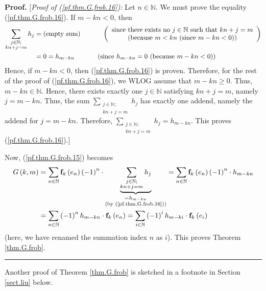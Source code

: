 \documentclass[numbers=enddot,12pt,final,onecolumn,notitlepage]{scrartcl}%
\theoremstyle{definition}
\newenvironment{proof}[1][Proof]{\noindent\textbf{#1.} }{\ \rule{0.5em}{0.5em}}
\let\sumnonlimits\sum
\renewcommand{\sum}{\sumnonlimits\limits}
\newenvironment{verlong}{}{}
\begin{document}
\begin{proof}
\begin{verlong}
[\textit{Proof of (\ref{pf.thm.G.frob.16}):} Let $n\in\mathbb{N}$. We must
prove the equality (\ref{pf.thm.G.frob.16}). If $m-kn<0$, then%
\begin{align*}
\sum_{\substack{j\in\mathbb{N};\\kn+j=m}}h_{j}  &  =\left(  \text{empty
sum}\right)  \ \ \ \ \ \ \ \ \ \ \left(
\begin{array}
[c]{c}%
\text{since there exists no }j\in\mathbb{N}\text{ such that }kn+j=m\\
\text{(because }m<kn\text{ (since }m-kn<0\text{))}%
\end{array}
\right) \\
&  =0=h_{m-kn}\ \ \ \ \ \ \ \ \ \ \left(  \text{since }h_{m-kn}=0\text{
(because }m-kn<0\text{)}\right)
\end{align*}
Hence, if $m-kn<0$, then (\ref{pf.thm.G.frob.16}) is proven. Therefore, for
the rest of the proof of (\ref{pf.thm.G.frob.16}), we WLOG assume that
$m-kn\geq0$. Thus, $m-kn\in\mathbb{N}$. Hence, there exists exactly one
$j\in\mathbb{N}$ satisfying $kn+j=m$, namely $j=m-kn$. Thus, the sum
$\sum_{\substack{j\in\mathbb{N};\\kn+j=m}}h_{j}$ has exactly one addend,
namely the addend for $j=m-kn$. Therefore, $\sum_{\substack{j\in
\mathbb{N};\\kn+j=m}}h_{j}=h_{m-kn}$. This proves (\ref{pf.thm.G.frob.16}).]
\end{verlong}

Now, (\ref{pf.thm.G.frob.15}) becomes%
\begin{align*}
G\left(  k,m\right)   &  =\sum_{n\in\mathbb{N}}\mathbf{f}_{k}\left(
e_{n}\right)  \left(  -1\right)  ^{n}\cdot\underbrace{\sum_{\substack{j\in
\mathbb{N};\\kn+j=m}}h_{j}}_{\substack{=h_{m-kn}\\\text{(by
(\ref{pf.thm.G.frob.16}))}}}=\sum_{n\in\mathbb{N}}\mathbf{f}_{k}\left(
e_{n}\right)  \left(  -1\right)  ^{n}\cdot h_{m-kn}\\
&  =\sum_{n\in\mathbb{N}}\left(  -1\right)  ^{n}h_{m-kn}\cdot\mathbf{f}%
_{k}\left(  e_{n}\right)  =\sum_{i\in\mathbb{N}}\left(  -1\right)
^{i}h_{m-ki}\cdot\mathbf{f}_{k}\left(  e_{i}\right)
\end{align*}
(here, we have renamed the summation index $n$ as $i$). This proves Theorem
\ref{thm.G.frob}.
\end{proof}

Another proof of Theorem \ref{thm.G.frob} is sketched in a footnote in Section
\ref{sect.liu} below.
\end{document}
